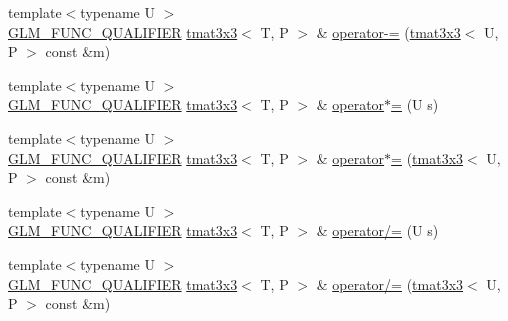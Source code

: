 \begin{DoxyCompactItemize}
\item 
{\footnotesize template$<$typename U $>$ }\\\hyperlink{setup_8hpp_a33fdea6f91c5f834105f7415e2a64407}{G\+L\+M\+\_\+\+F\+U\+N\+C\+\_\+\+Q\+U\+A\+L\+I\+F\+I\+ER} \hyperlink{structglm_1_1detail_1_1tmat3x3}{tmat3x3}$<$ T, P $>$ \& \hyperlink{structglm_1_1detail_1_1tmat3x3_aee1a83177bbf6078a9d2ef4f753dccb4}{operator-\/=} (\hyperlink{structglm_1_1detail_1_1tmat3x3}{tmat3x3}$<$ U, P $>$ const \&m)
\item 
{\footnotesize template$<$typename U $>$ }\\\hyperlink{setup_8hpp_a33fdea6f91c5f834105f7415e2a64407}{G\+L\+M\+\_\+\+F\+U\+N\+C\+\_\+\+Q\+U\+A\+L\+I\+F\+I\+ER} \hyperlink{structglm_1_1detail_1_1tmat3x3}{tmat3x3}$<$ T, P $>$ \& \hyperlink{structglm_1_1detail_1_1tmat3x3_a3340b55021366a2f8bbed8299416bfdb}{operator$\ast$=} (U s)
\item 
{\footnotesize template$<$typename U $>$ }\\\hyperlink{setup_8hpp_a33fdea6f91c5f834105f7415e2a64407}{G\+L\+M\+\_\+\+F\+U\+N\+C\+\_\+\+Q\+U\+A\+L\+I\+F\+I\+ER} \hyperlink{structglm_1_1detail_1_1tmat3x3}{tmat3x3}$<$ T, P $>$ \& \hyperlink{structglm_1_1detail_1_1tmat3x3_af8ac2b47f30d93952aec87ca734934a5}{operator$\ast$=} (\hyperlink{structglm_1_1detail_1_1tmat3x3}{tmat3x3}$<$ U, P $>$ const \&m)
\item 
{\footnotesize template$<$typename U $>$ }\\\hyperlink{setup_8hpp_a33fdea6f91c5f834105f7415e2a64407}{G\+L\+M\+\_\+\+F\+U\+N\+C\+\_\+\+Q\+U\+A\+L\+I\+F\+I\+ER} \hyperlink{structglm_1_1detail_1_1tmat3x3}{tmat3x3}$<$ T, P $>$ \& \hyperlink{structglm_1_1detail_1_1tmat3x3_a676cc80fc06dbc44a4eef890452cb12c}{operator/=} (U s)
\item 
{\footnotesize template$<$typename U $>$ }\\\hyperlink{setup_8hpp_a33fdea6f91c5f834105f7415e2a64407}{G\+L\+M\+\_\+\+F\+U\+N\+C\+\_\+\+Q\+U\+A\+L\+I\+F\+I\+ER} \hyperlink{structglm_1_1detail_1_1tmat3x3}{tmat3x3}$<$ T, P $>$ \& \hyperlink{structglm_1_1detail_1_1tmat3x3_a7664a2c6d0e4f299e0e53efcbb4dcabf}{operator/=} (\hyperlink{structglm_1_1detail_1_1tmat3x3}{tmat3x3}$<$ U, P $>$ const \&m)
\end{DoxyCompactItemize}
